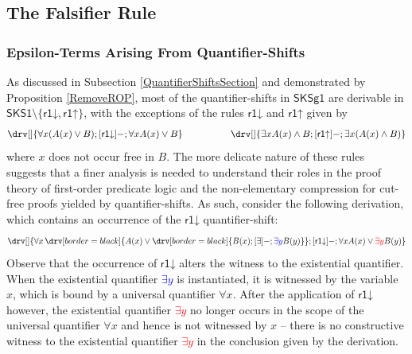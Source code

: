 \documentclass[10pt]{article}
\theoremstyle{definition}\newtheorem{remark}[theorem]{Remark}
\theoremstyle{definition}\newtheorem{example}[theorem]{Example}
\theoremstyle{definition}\newtheorem{definition}[theorem]{Definition}
\newcommand{\SKSq}{{\mathsf{SKSg1}}}
\newcommand{\SKSqDecomp}{{\mathsf{SKS1}}}
\newcommand{\rOneUp}{{\mathsf{r1\mathord\uparrow}}}
\newcommand{\rOneDown}{{\mathsf{r1\mathord\downarrow}}}
\begin{document}
	\subsection{The Falsifier Rule}\label{FalsifierRuleSection}
	
	\subsubsection*{Epsilon-Terms Arising From Quantifier-Shifts}
	
	As discussed in Subsection \ref{QuantifierShiftsSection} and demonstrated by Proposition \ref{RemoveROP}, most of the quantifier-shifts in $\SKSq$ are derivable in $\SKSqDecomp \setminus \{\rOneDown, \rOneUp\}$, with the exceptions of the rules $\rOneDown$ and $\rOneUp$ given by
	\[
		\drv[] {
			\forall x (A(x) \lor B) ; [\rOneDown]- ; \forall x A(x) \lor B
		} \hspace{5em} \drv[] {
			\exists x A(x) \land B ; [\rOneUp]- ; \exists x (A(x) \land B)
		}
	\]
	where $x$ does not occur free in $B$. The more delicate nature of these rules suggests that a finer analysis is needed to understand their roles in the proof theory of first-order predicate logic and the non-elementary compression for cut-free proofs yielded by quantifier-shifts. As such, consider the following derivation, which contains an occurrence of the $\rOneDown$ quantifier-shift:
	\[
		\drv[] {
			\forall x \, \drv[border=black] {
				A(x) \lor \drv[border=black] {
					B(x) ; [\exists]- ; \textcolor{blue}{\exists y} B(y)
				}
			} ; [\rOneDown]- ;
			\forall x A(x) \lor \textcolor{red}{\exists y} B(y)
		}
	\]
	Observe that the occurrence of $\rOneDown$ alters the witness to the existential quantifier. When the existential quantifier \textcolor{blue}{$\exists y$} is instantiated, it is witnessed by the variable $x$, which is bound by a universal quantifier $\forall x$. After the application of $\rOneDown$ however, the existential quantifier \textcolor{red}{$\exists y$} no longer occurs in the scope of the universal quantifier $\forall x$ and hence is not witnessed by $x$ – there is no constructive witness to the existential quantifier \textcolor{red}{$\exists y$} in the conclusion given by the derivation.
	
\end{document}
